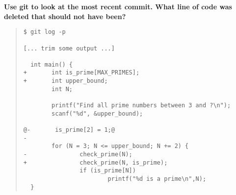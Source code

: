 \documentclass{article}
\begin{document}
\textbf{Use git to look at the most recent commit. What line of code was
  deleted that should not have been?}

\begin{quote}
  \begin{lstlisting}
$ git log -p

[... trim some output ...]

  int main() {
+       int is_prime[MAX_PRIMES];
+       int upper_bound;
        int N;

        printf("Find all prime numbers between 3 and ?\n");
        scanf("%d", &upper_bound);

@-       is_prime[2] = 1;@
-
        for (N = 3; N <= upper_bound; N += 2) {
-               check_prime(N);
+               check_prime(N, is_prime);
                if (is_prime[N])
                        printf("%d is a prime\n",N);
  }
  \end{lstlisting}
\end{quote}
\end{document}
